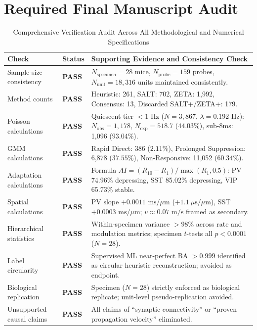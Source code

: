 \documentclass[10pt,journal,compsoc]{IEEEtran}
\begin{document}
\section*{Required Final Manuscript Audit}
\begin{table}[t]
\caption{Comprehensive Verification Audit Across All Methodological and Numerical Specifications}
\label{tab:audit}
\centering
\small
\setlength{\tabcolsep}{6pt}
\begin{tabularx}{\textwidth}{lp{1.5cm}>{\raggedright\arraybackslash}X}
\toprule
\textbf{Check} & \textbf{Status} & \textbf{Supporting Evidence and Consistency Check} \\
\midrule
Sample-size consistency        & \textbf{PASS} & $N_{\text{specimen}}=28$ mice, $N_{\text{probe}}=159$ probes, $N_{\text{unit}}=18,316$ units maintained consistently. \\
Method counts                  & \textbf{PASS} & Heuristic: 261, SALT: 702, ZETA: 1,992, Consensus: 13, Discarded SALT+/ZETA+: 179. \\
Poisson calculations           & \textbf{PASS} & Quiescent tier $<1$ Hz ($N=3,867$, $\lambda=0.192$ Hz): $N_{\text{obs}}=1,178$, $N_{\text{exp}}=518.7$ ($44.03\%$), sub-8ms: 1,096 ($93.04\%$). \\
GMM calculations               & \textbf{PASS} & Rapid Direct: 386 ($2.11\%$), Prolonged Suppression: 6,878 ($37.55\%$), Non-Responsive: 11,052 ($60.34\%$). \\
Adaptation calculations        & \textbf{PASS} & Formula $AI = (R_{10} - R_1)/\max(R_1, 0.5)$: PV 74.96\% depressing, SST 85.02\% depressing, VIP 65.73\% stable. \\
Spatial calculations           & \textbf{PASS} & PV slope $+0.0011\text{ ms}/\mu\text{m}$ ($+1.1\ \mu\text{s}/\mu\text{m}$), SST $+0.0003\text{ ms}/\mu\text{m}$; $v \approx 0.07\text{ m/s}$ framed as secondary. \\
Hierarchical statistics        & \textbf{PASS} & Within-specimen variance $>98\%$ across rate and modulation metrics; specimen $t$-tests all $p < 0.0001$ ($N=28$). \\
Label circularity              & \textbf{PASS} & Supervised ML near-perfect BA $>0.999$ identified as circular heuristic reconstruction; avoided as endpoint. \\
Biological replication         & \textbf{PASS} & Specimen ($N=28$) strictly enforced as biological replicate; unit-level pseudo-replication avoided. \\
Unsupported causal claims      & \textbf{PASS} & All claims of ``synaptic connectivity'' or ``proven propagation velocity'' eliminated. \\
\bottomrule
\end{tabularx}
\end{table}
\end{document}
